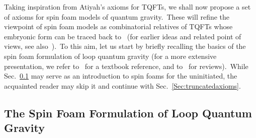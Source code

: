 \documentclass[11pt]{article}
\theoremstyle{definition}
\numberwithin{equation}{section}
\begin{document}
Taking inspiration from Atiyah’s axioms for TQFTs, we shall now propose a set of axioms for spin foam models of quantum gravity.~These will refine the viewpoint of spin foam models as combinatorial relatives of TQFTs whose embryonic form can be traced back to~\cite{Rovelli:2010vv,Rovelli_Smerlak_2012,Rovelli:2011eq} (for earlier ideas and related point of views, see also~\cite{Baez_1998,Baez:1999sr,Crane_1994,Oeckl_2003a}).~To this aim, let us start by briefly recalling the basics of the spin foam formulation of loop quantum gravity (for a more extensive presentation, we refer to~\cite{Rovelli_Vidotto_2014} for a textbook reference, and to~\cite{Baez:1999sr,Perez_2013,Bianchi:2017hjl,Engle_Speziale_2023} for reviews).~While Sec.~\ref{Sec:SFreview} may serve as an introduction to spin foams for the uninitiated, the acquainted reader may skip it and continue with Sec.~\ref{Sec:truncatedaxioms}.

\subsection{The Spin Foam Formulation of Loop Quantum Gravity}\label{Sec:SFreview}
\end{document}
